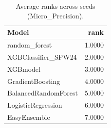 \begin{table}[t]
\centering
\begin{tabular}{lr}
\toprule
Model & rank \\
\midrule
random_forest & 1.0000 \\
XGBClassifier_SPW24 & 2.0000 \\
XGBmodel & 3.0000 \\
GradientBoosting & 4.0000 \\
BalancedRandomForest & 5.0000 \\
LogisticRegression & 6.0000 \\
EasyEnsemble & 7.0000 \\
\bottomrule
\end{tabular}
\caption{Average ranks across seeds (Micro_Precision).}
\label{tab:avg_rank_Micro_Precision}
\end{table}